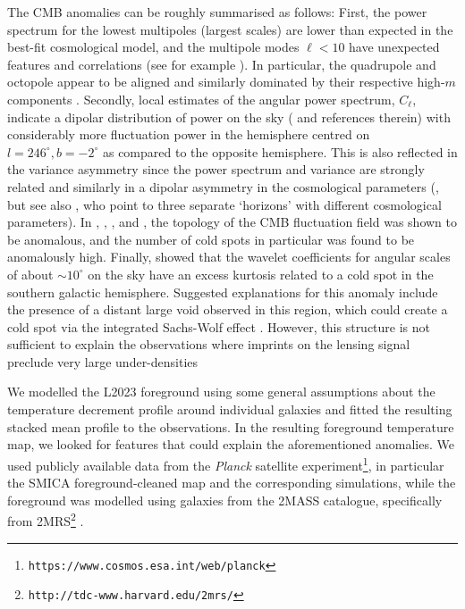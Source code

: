 \documentclass{aa}
\begin{document}
The CMB anomalies can be roughly summarised as follows: First, the power spectrum for the lowest multipoles (largest scales) are lower than expected in the best-fit cosmological model, and the multipole modes $\ell<10$ have unexpected features and correlations (see for example \citealt{lowmultipoles}). In particular, the quadrupole and octopole appear to be aligned and similarly dominated by their respective high-$m$ components \citep{alignment}.  Secondly, local estimates of the angular power spectrum, $C_\ell$, indicate a dipolar distribution of power on the sky (\citealt{iands2018} and references therein) with considerably more fluctuation power in the hemisphere centred on $l=246^\circ, b = -2^\circ$ as compared to the opposite hemisphere. This is also reflected in the variance asymmetry \citep{iands2018} since the power spectrum and variance are strongly related and similarly in a dipolar asymmetry in the cosmological parameters (\citealt{paramdipole}, but see also \citealt{paramhorizons}, who point to three separate `horizons' with different cosmological parameters). In \citet{minkowski1}, \citet{minkowski2}, \citet{topology1}, and \citet{topology2}, the topology of the CMB fluctuation field was shown to be anomalous, and the number of cold spots in particular  was found to be anomalously high. Finally, \cite{vielva} showed that the wavelet coefficients for angular scales of about $\sim10^\circ$ on the sky have an excess kurtosis related to a cold spot in the southern galactic hemisphere. Suggested explanations for this anomaly include the presence of a distant large void observed in this region, which could create a cold spot via the integrated Sachs-Wolf effect \cite[see][for a recent update]{void}. However, this structure is not sufficient to explain the observations where imprints on the lensing signal preclude very large under-densities \citep{lensColdSpot}

We modelled the L2023 foreground using some general assumptions about the temperature decrement profile around individual galaxies and fitted the resulting stacked mean profile to the observations. In the resulting foreground temperature map, we looked for features that could explain the aforementioned anomalies. We used publicly available data from the \textit{Planck} satellite experiment\footnote{\texttt{https://www.cosmos.esa.int/web/planck}}, in particular the SMICA foreground-cleaned map \citep{compsep2018} and the corresponding simulations, while the foreground was modelled using galaxies from the 2MASS catalogue, specifically from 2MRS\footnote{\texttt{http://tdc-www.harvard.edu/2mrs/}}  \citep{2mrs}.
 
\end{document}
